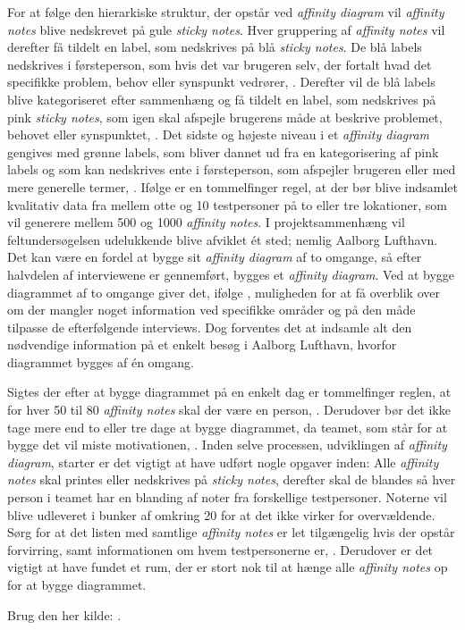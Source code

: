 For at følge den hierarkiske struktur, der opstår ved \textit{affinity diagram} vil \textit{affinity notes} blive nedskrevet på gule \textit{sticky notes}. Hver gruppering af \textit{affinity notes} vil derefter få tildelt en label, som nedskrives på blå \textit{sticky notes}. De blå labels nedskrives i førsteperson, som hvis det var brugeren selv, der fortalt hvad det specifikke problem, behov eller synspunkt vedrører, \parencite[s. 160]{Book:BuildingAnAffinity}. Derefter vil de blå labels blive kategoriseret efter sammenhæng og få tildelt en label, som nedskrives på pink \textit{sticky notes}, som igen skal afspejle brugerens måde at beskrive problemet, behovet eller synspunktet, \parencite[s. 160]{Book:BuildingAnAffinity}. Det sidste og højeste niveau i et \textit{affinity diagram} gengives med grønne labels, som bliver dannet ud fra en kategorisering af pink labels og som kan nedskrives ente i førsteperson, som afspejler brugeren eller med mere generelle termer, \parencite[s. 160]{Book:BuildingAnAffinity}. \blankline
%
Ifølge \textcite[s. 161]{Book:BuildingAnAffinity} er en tommelfinger regel, at der bør blive indsamlet kvalitativ data fra mellem otte og 10 testpersoner på to eller tre lokationer, som vil generere mellem 500 og 1000 \textit{affinity notes}. I projektsammenhæng vil feltundersøgelsen udelukkende blive afviklet ét sted; nemlig Aalborg Lufthavn. Det kan være en fordel at bygge sit \textit{affinity diagram} af to omgange, så efter halvdelen af interviewene er gennemført, bygges et \textit{affinity diagram}. Ved at bygge diagrammet af to omgange giver det, ifølge \textcite[s. 162]{Book:BuildingAnAffinity}, muligheden for at få overblik over om der mangler noget information ved specifikke områder og på den måde tilpasse de efterfølgende interviews. Dog forventes det at indsamle alt den nødvendige information på et enkelt besøg i Aalborg Lufthavn, hvorfor diagrammet bygges af én omgang. 

Sigtes der efter at bygge diagrammet på en enkelt dag er tommelfinger reglen, at for hver 50 til 80 \textit{affinity notes} skal der være en person, \parencite[s. 163]{Book:BuildingAnAffinity}. Derudover bør det ikke tage mere end to eller tre dage at bygge diagrammet, da teamet, som står for at bygge det vil miste motivationen, \parencite[s. 163]{Book:BuildingAnAffinity}.\blankline
%
Inden selve processen, udviklingen af \textit{affinity diagram}, starter er det vigtigt at have udført nogle opgaver inden: Alle \textit{affinity notes} skal printes eller nedskrives på \textit{sticky notes}, derefter skal de blandes så hver person i teamet har en blanding af noter fra forskellige testpersoner. Noterne vil blive udleveret i bunker af omkring 20 for at det ikke virker for overvældende. Sørg for at det listen med samtlige \textit{affinity notes} er let tilgængelig hvis der opstår forvirring, samt informationen om hvem testpersonerne er, \parencite[ss. 163-164]{Book:BuildingAnAffinity}. Derudover er det vigtigt at have fundet et rum, der er stort nok til at hænge alle \textit{affinity notes} op for at bygge diagrammet.  

        



    






  


Brug den her kilde: \textcite[ss. 24-28]{PDF:ConsolidationIdeationAffinity}. 

